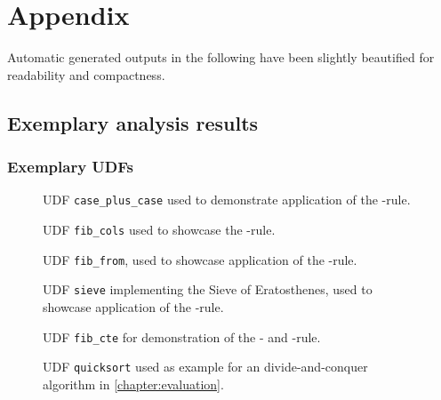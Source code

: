 \cleardoublepage
\renewcommand{\thesection}{\Alph{section}}%

\chapter[Appendix]{Appendix}
Automatic generated outputs in the following have been slightly beautified for readability and compactness.

\section{Exemplary analysis results}

\subsection{Exemplary UDFs}

\begin{figure}[h!]
    \centering
    
    \caption{UDF \texttt{case\_plus\_case} used to demonstrate application of the \REXPR-rule.}
    \label{udf:case_plus_case}
\end{figure}

\begin{figure}[h!]
    \centering
    
    \caption{UDF \texttt{fib\_cols} used to showcase the \RSELECT-rule.}
    \label{udf:fib_cols}
\end{figure}

\begin{figure}[h!]
    \centering
    
    \caption{UDF \texttt{fib\_from}, used to showcase application of the \RFROM-rule.}
    \label{udf:fib_from}
\end{figure}

\begin{figure}[h!]
    \centering
    
    \caption{UDF \texttt{sieve} implementing the Sieve of Eratosthenes, used to showcase application of the \RWHERE-rule.}
    \label{udf:sieve}
\end{figure}

\begin{figure}[h!]
    \centering
    
    \caption{UDF \texttt{fib\_cte} for demonstration of the \RCTE- and \RWITH-rule.}
    \label{udf:fib_cte}
\end{figure}

\begin{figure}[h!]
    \centering
    \caption{UDF \texttt{quicksort} used as example for an divide-and-conquer algorithm in \autoref{chapter:evaluation}.}
    \label{udf:fib_cte}
\end{figure}

